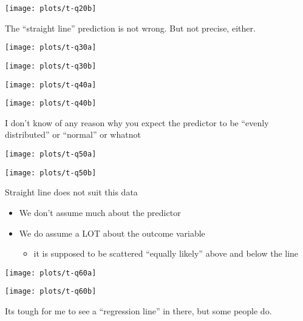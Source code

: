 \documentclass[10pt,english]{beamer}
\def\lyxframeend{} %
\begin{document}
\texttt{[image: plots/t-q20b]}

The ``straight line'' prediction is not wrong. But not precise,
either.


\lyxframeend{}


\texttt{[image: plots/t-q30a]}


\lyxframeend{}


\texttt{[image: plots/t-q30b]}


\lyxframeend{}


\texttt{[image: plots/t-q40a]}


\lyxframeend{}


\texttt{[image: plots/t-q40b]}

I don't know of any reason why you expect the predictor to be ``evenly
distributed'' or ``normal'' or whatnot


\lyxframeend{}


\texttt{[image: plots/t-q50a]}


\lyxframeend{}


\texttt{[image: plots/t-q50b]}

Straight line does not suit this data


\lyxframeend{}
\begin{itemize}
\item We don't assume much about the predictor
\item We do assume a LOT about the outcome variable

\begin{itemize}
\item it is supposed to be scattered ``equally likely'' above and below
the line
\end{itemize}
\end{itemize}

\lyxframeend{}


\texttt{[image: plots/t-q60a]}


\lyxframeend{}


\texttt{[image: plots/t-q60b]}

Its tough for me to see a ``regression line'' in there, but some
people do.
\end{document}
